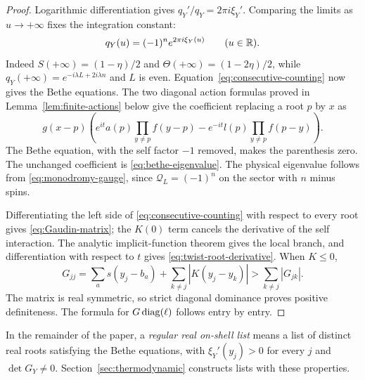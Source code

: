 \begin{proof}
Logarithmic differentiation gives $q_Y'/q_Y=2\pi i\xi_Y'$.
Comparing the limits as $u\to+\infty$ fixes the integration constant:
\begin{equation}\label{eq:q-counting-phase}
 q_Y(u)=(-1)^n e^{2\pi i\xi_Y(u)}\qquad(u\in\mathbb R).
\end{equation}
Indeed $S(+\infty)=(1-\eta)/2$ and
$\Theta(+\infty)=(1-2\eta)/2$, while
$q_Y(+\infty)=e^{-i\lambda L+2i\lambda n}$ and $L$ is even.
Equation~\eqref{eq:consecutive-counting} now gives the Bethe equations.
The two diagonal action formulas proved in
Lemma~\ref{lem:finite-actions} below give the coefficient replacing a
root $p$ by $x$ as
\[
 g(x-p)\left(
 e^{it}a(p)\prod_{y\ne p}f(y-p)
 -e^{-it}l(p)\prod_{y\ne p}f(p-y)\right).
\]
The Bethe equation, with the self factor $-1$ removed, makes the
parenthesis zero.  The unchanged coefficient is
\eqref{eq:bethe-eigenvalue}.  The physical eigenvalue follows from
\eqref{eq:monodromy-gauge}, since $\mathcal Q_L=(-1)^n$ on the sector
with $n$ minus spins.

Differentiating the left side of
\eqref{eq:consecutive-counting} with respect to every root gives
\eqref{eq:Gaudin-matrix}; the $K(0)$ term cancels the derivative of the
self interaction.  The analytic implicit-function theorem gives the
local branch, and differentiation with respect to $t$ gives
\eqref{eq:twist-root-derivative}.  When $K\le0$,
\[
 G_{jj}=\sum_a s(y_j-b_a)+\sum_{k\ne j}|K(y_j-y_k)|
       >\sum_{k\ne j}|G_{jk}|.
\]
The matrix is real symmetric, so strict diagonal dominance proves
positive definiteness.  The formula for $G\operatorname{diag}(\ell)$ follows
entry by entry.
\end{proof}

In the remainder of the paper, a \emph{regular real on-shell list}
means a list of distinct real roots satisfying the Bethe equations,
with $\xi_Y'(y_j)>0$ for every $j$ and $\det G_Y\ne0$.
Section~\ref{sec:thermodynamic} constructs lists with these properties.


